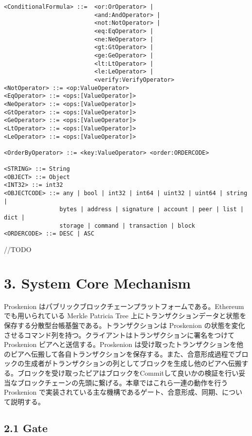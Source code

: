 \begin{verbatim}
<ConditionalFormula> ::=  <or:OrOperator> |
                          <and:AndOperator> |
                          <not:NotOperator> |
                          <eq:EqOperator> |
                          <ne:NeOperator> |
                          <gt:GtOperator> |
                          <ge:GeOperator> |
                          <lt:LtOperator> |
                          <le:LeOperator> |
                          <verify:VerifyOperator>
<NotOperator> ::= <op:ValueOperator>
<EqOperator> ::= <ops:[ValueOperator]>
<NeOperator> ::= <ops:[ValueOperator]>
<GtOperator> ::= <ops:[ValueOperator]>
<GeOperator> ::= <ops:[ValueOperator]>
<LtOperator> ::= <ops:[ValueOperator]>
<LeOperator> ::= <ops:[ValueOperator]>

<OrderByOperator> ::= <key:ValueOperator> <order:ORDERCODE>

<STRING> ::= String
<OBJECT> ::= Object
<INT32> ::= int32
<OBJECTCODE> ::= any | bool | int32 | int64 | uint32 | uint64 | string |
                bytes | address | signature | account | peer | list | dict |
                storage | command | transaction | block
<ORDERCODE> ::= DESC | ASC
\end{verbatim}

//TODO

\hypertarget{system-core-mechanism}{%
\chapter{3. System Core Mechanism}\label{system-core-mechanism}}

Proskenion はパブリックブロックチェーンプラットフォームである。Ethereum
でも用いられている Merkle Patricia Tree
上にトランザクションデータと状態を保存する分散型台帳基盤である。トランザクションは
Proskenion
の状態を変化させるコマンド列を持つ。クライアントはトランザクションに署名をつけて
Proskenion ピアへと送信する。Proskenion
は受け取ったトランザクションを他のピアへ伝搬して各自トランザクションを保存する。また、合意形成過程でブロックの生成者がトランザクションの列としてブロックを生成し他のピアへ伝搬する。ブロックを受け取ったピアはブロックをCommitして良いかの検証を行い妥当なブロックチェーンの先頭に繋げる。本章ではこれら一連の動作を行う
Proskenion
で実装されている主な機構であるゲート、合意形成、同期、について説明する。

\hypertarget{gate}{%
\section{2.1 Gate}\label{gate}}

